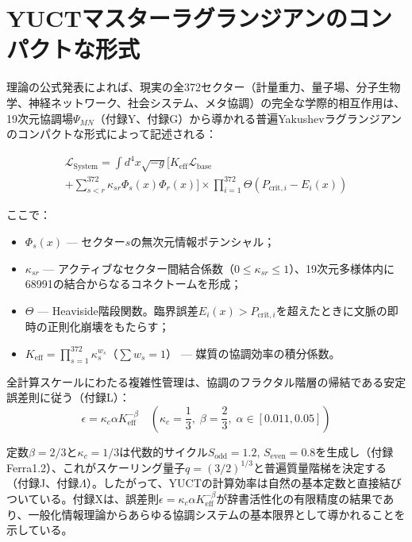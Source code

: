 \documentclass[11pt,a4paper]{article}
\begin{document}
	\section{YUCTマスターラグランジアンのコンパクトな形式}
	理論の公式発表によれば、現実の全372セクター（計量重力、量子場、分子生物学、神経ネットワーク、社会システム、メタ協調）の完全な学際的相互作用は、19次元協調場\(\Psi_{MN}\)（付録Y、付録G）から導かれる普遍Yakushevラグランジアンのコンパクトな形式によって記述される：
	
	\begin{multline}
		\mathscr{L}_{\text{System}} = \int d^4x \sqrt{-g} \Bigg[ K_{\text{eff}} \mathscr{L}_{\text{base}} \\
		+ \sum_{s<r}^{372} \kappa_{sr} \Phi_s(x) \Phi_r(x) \Bigg] \times \prod_{i=1}^{372} \Theta(P_{\text{crit},i} - E_i(x))
	\end{multline}
	
	ここで：
	\begin{itemize}
		\item \(\Phi_s(x)\) — セクター\(s\)の無次元情報ポテンシャル；
		\item \(\kappa_{sr}\) — アクティブなセクター間結合係数（\(0 \le \kappa_{sr} \le 1\)）、19次元多様体内に68991の結合からなるコネクトームを形成；
		\item \(\Theta\) — Heaviside階段関数。臨界誤差\(E_i(x) > P_{\text{crit},i}\)を超えたときに文脈の即時の正則化崩壊をもたらす；
		\item \(K_{\text{eff}} = \prod_{s=1}^{372} \kappa_s^{w_s}\)（\(\sum w_s = 1\)） — 媒質の協調効率の積分係数。
	\end{itemize}
	
	全計算スケールにわたる複雑性管理は、協調のフラクタル階層の帰結である安定誤差則に従う（付録L）：
	\begin{equation}
		\epsilon = \kappa_c \alpha K_{\text{eff}}^{-\beta} \quad \left(\kappa_c = \frac{1}{3}, \; \beta = \frac{2}{3}, \; \alpha \in [0.011, 0.05]\right)
	\end{equation}
	
	定数\(\beta = 2/3\)と\(\kappa_c = 1/3\)は代数的サイクル\(S_{\mathrm{odd}} = 1.2\), \(S_{\mathrm{even}} = 0.8\)を生成し（付録Ferra1.2）、これがスケーリング量子\(q = (3/2)^{1/3}\)と普遍質量階梯を決定する（付録J、付録\(\Lambda\)）。したがって、YUCTの計算効率は自然の基本定数と直接結びついている。付録Xは、誤差則\(\epsilon = \kappa_c\alpha K_{\mathrm{eff}}^{-\beta}\)が辞書活性化の有限精度の結果であり、一般化情報理論からあらゆる協調システムの基本限界として導かれることを示している。
	
\end{document}
